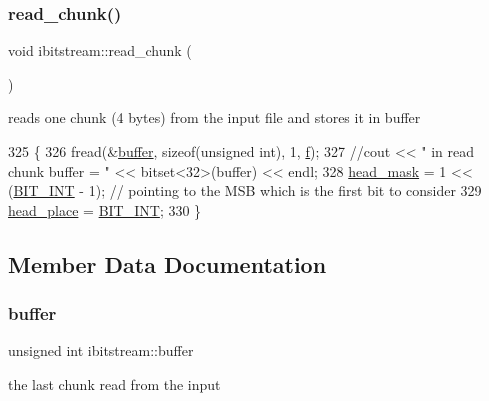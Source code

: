 \subsubsection{\texorpdfstring{read\+\_\+chunk()}{read\_chunk()}}
{\footnotesize\ttfamily void ibitstream\+::read\+\_\+chunk (\begin{DoxyParamCaption}{ }\end{DoxyParamCaption})}



reads one chunk (4 bytes) from the input file and stores it in buffer 


\begin{DoxyCode}
325                            \{
326   fread(&\hyperlink{classibitstream_a73f0b24d3d4402369f1abbb43f7f70ef}{buffer}, \textcolor{keyword}{sizeof}(\textcolor{keywordtype}{unsigned} \textcolor{keywordtype}{int}), 1, \hyperlink{classibitstream_a3ea2cdd0cf97820f0e1520c42e364308}{f});
327   \textcolor{comment}{//cout << " in read chunk  buffer = " << bitset<32>(buffer) << endl;}
328   \hyperlink{classibitstream_a48cd41991b6c29ea5120b53873a72a70}{head\_mask} = 1 << (\hyperlink{bitstream_8h_afcadf5aa65c5159bfb96c4d82ebc0a5d}{BIT\_INT} - 1); \textcolor{comment}{// pointing to the MSB which is the first bit to consider}
329   \hyperlink{classibitstream_a7b96359ac1534a5565e6e9b0cc53a0b3}{head\_place} = \hyperlink{bitstream_8h_afcadf5aa65c5159bfb96c4d82ebc0a5d}{BIT\_INT};
330 \}
\end{DoxyCode}


\subsection{Member Data Documentation}
\mbox{\label{classibitstream_a73f0b24d3d4402369f1abbb43f7f70ef}} 
\subsubsection{\texorpdfstring{buffer}{buffer}}
{\footnotesize\ttfamily unsigned int ibitstream\+::buffer\hspace{0.3cm}{\ttfamily [private]}}



the last chunk read from the input 

\mbox{\label{classibitstream_a3ea2cdd0cf97820f0e1520c42e364308}} 
